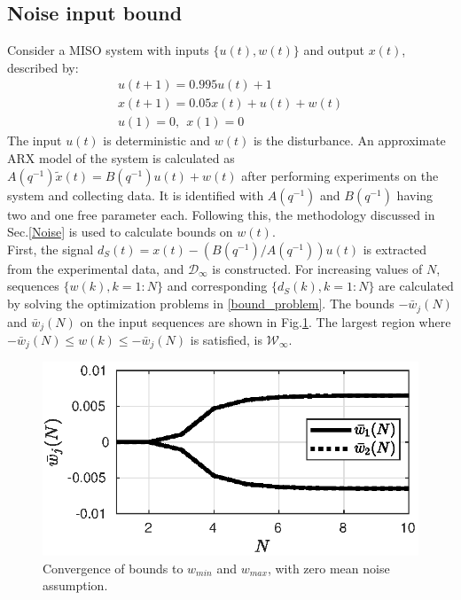 \documentclass[letterpaper, 10 pt, conference]{ieeeconf}  %
\begin{document}
	\subsection{Noise input bound}
	Consider a MISO system with inputs $\{u(t),w(t)\}$ and output $x(t)$, described by:
	\begin{equation*}
	\begin{matrix}
	u(t+1) = 0.995u(t)+1 \\
	x(t+1) = 0.05x(t)+u(t)+w(t) \\
	u(1) = 0, \hspace{5pt} x(1) = 0
	\end{matrix}
	\end{equation*}
	The input $u(t)$ is deterministic and $w(t)$ is the disturbance. An approximate ARX model of the system is calculated as $A(q^{-1})\tilde{x}(t) = B(q^{-1})u(t)+w(t)$ after performing experiments on the system and collecting data. It is identified with $A(q^{-1})$ and $B(q^{-1})$ having two and one free parameter each. Following this, the methodology discussed in Sec.\ref{Noise} is used to calculate bounds on $w(t)$.
	\\
	First, the signal $d_S(t)=x(t) - (B(q^{-1})/A(q^{-1}))u(t)$ is extracted from the experimental data, and $\mathcal{D}_{\infty}$ is constructed. For increasing values of $N$, sequences $\{w(k),k=1:N\}$ and corresponding $\{d_S(k),k=1:N\}$ are calculated by solving the optimization problems in \eqref{bound_problem}. The bounds $-\bar{w}_j(N)$ and $\bar{w}_j(N)$ on the input sequences are shown in Fig.\ref{bounds}.
	The largest region where $-\bar{w}_j(N) \leq w(k) \leq -\bar{w}_j(N)$ is satisfied, is $\mathcal{W}_{\infty}$. 
		\begin{figure}[h!]
			\hspace{30pt}
			\includegraphics[scale = 0.60]{bounds.eps}
			\caption{Convergence of bounds to $w_{min}$ and $w_{max}$, with zero mean noise assumption.}
			\label{bounds}
		\end{figure} \vspace{-5pt}\\
\end{document}
